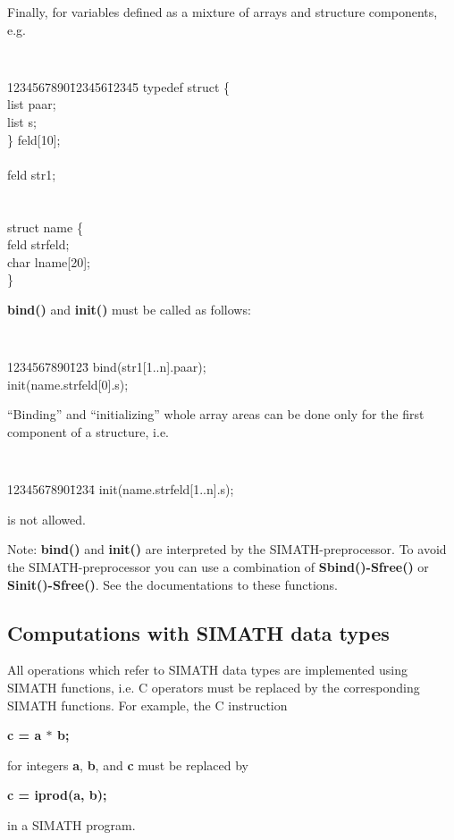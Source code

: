 Finally, for variables defined as a mixture of arrays and structure components,
e.g.
   {\tt
    \begin{tabbing}
    1234567890\=123456\=12345\=\kill
    \>    typedef struct \{ \> \\
    \> \>    list paar; \\
    \> \>    list s;    \\
    \>   \} feld[10]; \> \\
    \> \\   
    \>    feld str1;   \> \\
    \> \\   
    \> \\   
    \>    struct name \{ \> \\
    \> \>   feld strfeld; \\
    \> \>   char lname[20]; \\
    \>   \} 
    \end{tabbing}  
   }
{\bf bind()} and {\bf init()} must be called as follows:
   {\tt 
    \begin{tabbing}
    1234567890\=123\=\kill
    \>  bind(str1[1..n].paar);\\
    \>  init(name.strfeld[0].s);
    \end{tabbing}
   }
``Binding'' and ``initializing'' whole array areas can be done only
for the first component of a structure, i.e.
   {\tt 
    \begin{tabbing}
    1234567890\=1234\=\kill
    \>   init(name.strfeld[1..n].s);
    \end{tabbing}
   }
is not allowed.

Note: {\bf bind()} and {\bf init()} are interpreted by the SIMATH-preprocessor.
To avoid the SIMATH-preprocessor you can use a combination of 
{\bf Sbind()-Sfree()} or {\bf Sinit()-Sfree()}. See the documentations to
these functions.

\subsection{Computations with SIMATH data types}
All operations which refer to SI\-MATH data types are im\-ple\-men\-ted using 
SIMATH functions, i.e.\/ C operators must be replaced by the corresponding
SIMATH functions. For example, the C instruction
\begin{center} 
{\bf  c = a $*$ b;}
\end{center}
for integers {\bf a}, {\bf b}, and {\bf c} must be replaced by
\begin{center} 
{\bf  c = iprod(a, b);}
\end{center}
in a SIMATH program.

